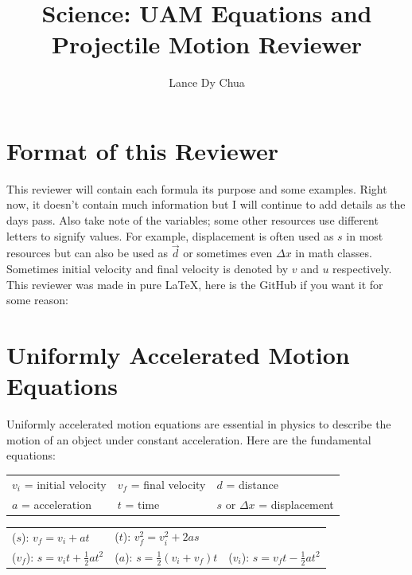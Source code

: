 \documentclass[12pt, letterpaper]{article}
\title{\textbf{Science: UAM Equations and Projectile Motion Reviewer}}
\author{Lance Dy Chua}
\affiliation{Xavier School San Juan}
\begin{document}
\maketitle
\graphicspath{ {./Graphs} }

\noindent\section{Format of this Reviewer}

\noindent This reviewer will contain each formula its purpose and some examples. Right now, it doesn't contain much information but I will continue to add details as the days pass. Also take note of the variables; some other resources use different letters to signify values. For example, displacement is often used as $s$ in most resources but can also be used as $\Vec{d}$ or sometimes even $\Delta x$ in math classes. Sometimes initial velocity and final velocity is denoted by $v$ and $u$ respectively. This reviewer was made in pure LaTeX, here is the GitHub if you want it for some reason: 

\noindent\section{Uniformly Accelerated Motion Equations}

\noindent Uniformly accelerated motion equations are essential in physics to describe the motion of an object under constant acceleration. Here are the fundamental equations:


\begin{center}
    \setlength{\tabcolsep}{10pt} %
    \renewcommand{\arraystretch}{1.5} %

    \begin{tabularx}{\textwidth} { 
        | >{\raggedright\arraybackslash}Y 
        | >{\raggedright\arraybackslash}Y 
        | >{\raggedright\arraybackslash}Y | }
    \hline
    $v_i$ = initial velocity & $v_f$ = final velocity & $d$ = distance\\
    $a$ = acceleration & $t$ = time & $s$ or $\Delta x$ = displacement\\
    \hline
    \end{tabularx}

    \bigskip

    \begin{tabularx}{\textwidth} { 
        | >{\raggedright\arraybackslash}Y 
        | >{\raggedright\arraybackslash}Y 
        | >{\raggedright\arraybackslash}Y | }
    \hline
    ($s$): $v_f = v_i + at$ & ($t$): $v_f^2 = v_i^2 + 2as$ & $ $\\
    ($v_f$): $s = v_i t + \frac{1}{2} at^2$ & ($a$): $s = \frac{1}{2}(v_i + v_f)t$ & ($v_i$): $s = v_f t - \frac{1}{2} at^2$\\
    \hline
    \end{tabularx}
\end{center}
\end{document}
